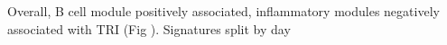\begin{outline}
    \1 Overall, B cell module positively associated, inflammatory modules negatively associated with TRI (Fig ).
\1 Signatures split by day
\end{outline}


